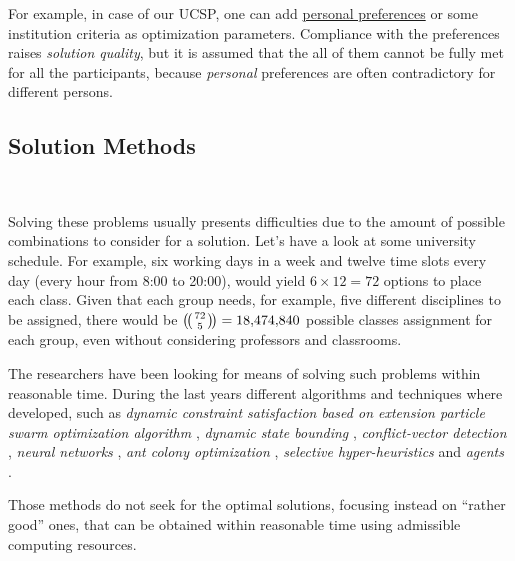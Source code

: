   For example, in case of our UCSP,
one can add \underline{personal preferences} or some institution criteria as
optimization parameters.
  Compliance with the preferences raises \emph{solution quality},
but it is assumed that the all of them cannot be fully met for all the
participants, because \emph{personal} preferences are often
contradictory for different persons.

\subsection{Solution Methods}
\\
\medskip

\noindent
  Solving these problems usually presents difficulties due to the amount of
possible combinations to consider for a solution. Let's have a look at
some university schedule.
  For example, six working days in a week and twelve time slots every day
(every hour from 8:00 to 20:00), would yield $6 \times 12 = 72$ options
to place each class.
  Given that each group needs, for example, five different disciplines to be assigned,
there would be  $\multibinom{72}{5} = \num[group-separator={,}]{18474840}$
possible classes assignment for each group,
even without considering professors and classrooms.

\bigskip
 \todo
\medskip
\noindent

  The researchers have been looking for means of solving such
problems within reasonable time.
  During the last years different algorithms and techniques where developed,
such as
\emph{dynamic constraint satisfaction based on extension particle swarm
      optimization algorithm} \cite{CSPswarm},
\emph{dynamic state bounding} \cite{CSPdynStateBound},
\emph{conflict-vector detection} \cite{CSPtimetable},
\emph{neural networks} \cite{CSPneuro},
\emph{ant colony optimization} \cite{CSPcunningACO, CSPlimmemACO},
\emph{selective hyper-heuristics} \cite{CSPhypHeur}
and \emph{agents} \cite{CSPagent2013, CSPagent2014, DCSPagent1998}.

\medskip

Those methods do not seek for the optimal solutions, focusing instead on
``rather good'' ones, that can be obtained within reasonable time using admissible
computing resources.

